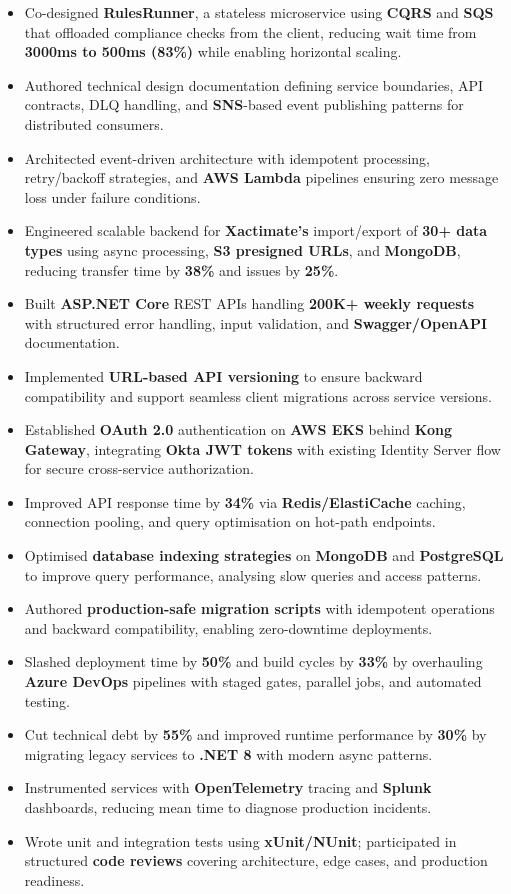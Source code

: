 \documentclass[a4paper,10pt]{article}
\begin{document}
\begin{itemize}[leftmargin=*]
    \item Co-designed \textbf{RulesRunner}, a stateless microservice using \textbf{CQRS} and \textbf{SQS} that offloaded compliance checks from the client, reducing wait time from \textbf{3000ms to 500ms (83\%)} while enabling horizontal scaling.
    \item Authored technical design documentation defining service boundaries, API contracts, DLQ handling, and \textbf{SNS}-based event publishing patterns for distributed consumers.
    \item Architected event-driven architecture with idempotent processing, retry/backoff strategies, and \textbf{AWS Lambda} pipelines ensuring zero message loss under failure conditions.
    \item Engineered scalable backend for \textbf{Xactimate's} import/export of \textbf{30+ data types} using async processing, \textbf{S3 presigned URLs}, and \textbf{MongoDB}, reducing transfer time by \textbf{38\%} and issues by \textbf{25\%}.
    \item Built \textbf{ASP.NET Core} REST APIs handling \textbf{200K+ weekly requests} with structured error handling, input validation, and \textbf{Swagger/OpenAPI} documentation.
    \item Implemented \textbf{URL-based API versioning} to ensure backward compatibility and support seamless client migrations across service versions.
    \item Established \textbf{OAuth 2.0} authentication on \textbf{AWS EKS} behind \textbf{Kong Gateway}, integrating \textbf{Okta JWT tokens} with existing Identity Server flow for secure cross-service authorization.
    \item Improved API response time by \textbf{34\%} via \textbf{Redis/ElastiCache} caching, connection pooling, and query optimisation on hot-path endpoints.
    \item Optimised \textbf{database indexing strategies} on \textbf{MongoDB} and \textbf{PostgreSQL} to improve query performance, analysing slow queries and access patterns.
    \item Authored \textbf{production-safe migration scripts} with idempotent operations and backward compatibility, enabling zero-downtime deployments.
    \item Slashed deployment time by \textbf{50\%} and build cycles by \textbf{33\%} by overhauling \textbf{Azure DevOps} pipelines with staged gates, parallel jobs, and automated testing.
    \item Cut technical debt by \textbf{55\%} and improved runtime performance by \textbf{30\%} by migrating legacy services to \textbf{.NET 8} with modern async patterns.
    \item Instrumented services with \textbf{OpenTelemetry} tracing and \textbf{Splunk} dashboards, reducing mean time to diagnose production incidents.
    \item Wrote unit and integration tests using \textbf{xUnit/NUnit}; participated in structured \textbf{code reviews} covering architecture, edge cases, and production readiness.
\end{itemize}
\end{document}
